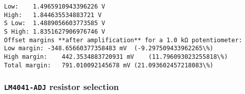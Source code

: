 \documentclass[11pt]{article}
\begin{document}
    \begin{Verbatim}[commandchars=\\\{\}]
Low:	1.4965910943396226 V
High:	1.844635534883721 V
S Low:	1.4889056603773585 V
S High:	1.8351627906976746 V
Offset margins **after amplification** for a 1.0 kΩ potentiometer:
Low margin:	-348.65660377358483 mV	(-9.297509433962265\%)
High margin:	442.3534883720931 mV	(11.796093023255818\%)
Total margin:	791.010092145678 mV	(21.093602457218083\%)

    \end{Verbatim}

    \subsubsection{\texorpdfstring{\texttt{LM4041-ADJ} resistor
selection}{LM4041-ADJ resistor selection}}\label{lm4041-adj-resistor-selection}
\end{document}
